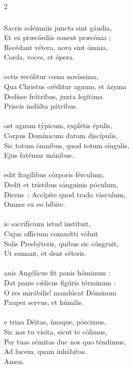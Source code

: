 \documentclass[9pt,twoside]{extarticle}
\begin{document}
\begin{multicols}{2}
{\subsubsection*{\center{}}
\lettrine{S}acris solémniis juncta sint gáudia,\\ Et ex præcórdiis sonent præcónia ;\\ Recédant vétera, nova sint ómnia,\\ Corda, voces, et ópera.\\
\\
octis recólitur cœna novíssima,\\ Qua Christus créditur agnum, et ázyma\\ Dedísse frátribus, juxta legítima\\ Priscis indúlta pátribus.\\
\\
ost agnum týpicum, explétis épulis,\\ Corpus Domínicum datum discípulis,\\ Sic totum ómnibus, quod totum síngulis,\\ Ejus fatémur mánibus.\\
\\
edit fragílibus córporis férculum,\\ Dedit et trístibus sánguinis póculum,\\ Dicens~: Accípite quod trado vásculum,\\ Omnes ex eo bíbite.\\
\\
ic sacrifícium istud instítuit,\\ Cujus offícium commítti vóluit\\ Solis Presbýteris, quibus sic cóngruit,\\ Ut sumant, et dent céteris.\\
\\
anis Angélicus fit panis hóminum :\\ Dat panis cǽlicus figúris términum :\\ O res mirábilis! mandúcat Dóminum\\ Pauper servus, et húmilis.\\
\\
e trina Déitas, únaque, póscimus,\\ Sic nos tu vísita, sicut te cólimus,\\ Per tuas sémitas duc nos quo téndimus,\\ Ad lucem, quam inhábitas.\\
Amen.
}
\end{multicols}
\end{document}
